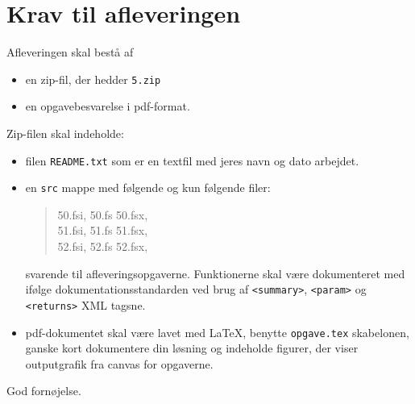 \documentclass[a4paper,12pt]{article}
\newcommand{\exerciseNumber}{5}
\begin{document}
\section*{Krav til afleveringen}
Afleveringen skal bestå af
\begin{itemize}
  \item en zip-fil, der hedder \texttt{\exerciseNumber\typeLetter.zip}
  \item en opgavebesvarelse i pdf-format.
\end{itemize}
Zip-filen skal indeholde:
\begin{itemize}
\item filen \texttt{README.txt} som er en textfil med jeres navn og dato arbejdet.
\item en \texttt{src} mappe med følgende og kun
  følgende filer:
  \begin{quote}
    \exerciseNumber\typeLetter0.fsi, \exerciseNumber\typeLetter0.fs \exerciseNumber\typeLetter0.fsx,\\
    \exerciseNumber\typeLetter1.fsi, \exerciseNumber\typeLetter1.fs \exerciseNumber\typeLetter1.fsx,\\
    \exerciseNumber\typeLetter2.fsi, \exerciseNumber\typeLetter2.fs \exerciseNumber\typeLetter2.fsx,\\
  \end{quote}
  svarende til afleveringsopgaverne. Funktionerne skal være dokumenteret med ifølge dokumentationsstandarden ved brug af \verb|<summary>|, \verb|<param>| og \verb|<returns>| XML tagsne.
  \item pdf-dokumentet skal være lavet med \LaTeX, benytte \lstinline[language=console]{opgave.tex} skabelonen, ganske kort dokumentere din løsning og indeholde figurer, der viser outputgrafik fra canvas for opgaverne.
\end{itemize}

\flushright God fornøjelse.
\end{document}
